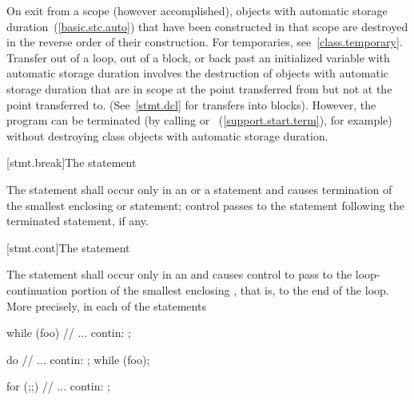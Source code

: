 \pnum
{}%
%
On exit from a scope (however accomplished), objects with automatic storage
duration~(\ref{basic.stc.auto}) that have been constructed in that scope are destroyed
in the reverse order of their construction. \enternote For temporaries,
see~\ref{class.temporary}. \exitnote Transfer out of a loop, out of a block, or back
past
an initialized variable with automatic storage duration involves the
destruction of objects with automatic storage duration that are in
scope at the point transferred from but not at the point transferred to.
(See~\ref{stmt.dcl} for transfers into blocks).
\enternote
However, the program can be terminated (by calling
%
%
 or
%
%
~(\ref{support.start.term}), for example) without
destroying class objects with automatic storage duration.
\exitnote

[stmt.break]{The  statement}%

\pnum
The  statement shall occur only in an
%
%
 or a  statement and causes
termination of the smallest enclosing  or
 statement; control passes to the statement following the
terminated statement, if any.

[stmt.cont]{The  statement}%

\pnum
The
statement shall occur only in an
%
and causes control to pass to the loop-continuation portion of the
smallest enclosing , that is, to the end
of the loop. More precisely, in each of the statements

\begin{minipage}{.30\hsize}
\begin{codeblock}
while (foo) {
  {
    // ...
  }
contin: ;
}
\end{codeblock}
\end{minipage}
\begin{minipage}{.30\hsize}
\begin{codeblock}
do {
  {
    // ...
  }
contin: ;
} while (foo);
\end{codeblock}
\end{minipage}
\begin{minipage}{.30\hsize}
\begin{codeblock}
for (;;) {
  {
    // ...
  }
contin: ;
}
\end{codeblock}
\end{minipage}

